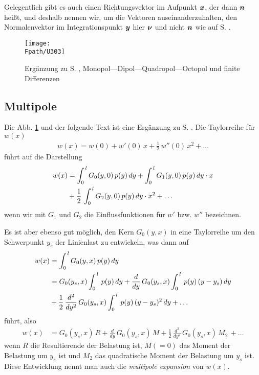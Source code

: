 \begin{remark}
Gelegentlich gibt es auch einen Richtungsvektor im Aufpunkt $\mbox{\boldmath $x$}$, der dann $\mbox{\boldmath $n$}$ hei{\ss}t, und deshalb nennen wir, um die Vektoren auseinanderzuhalten, den Normalenvektor im Integrationspunkt $\mbox{\boldmath $y$}$ hier $\mbox{\boldmath $\nu$}$ und nicht $\mbox{\boldmath $n$}$ wie auf S. \pageref{Ergebnis}.
\end{remark}
\begin{figure}[tbp]
\centering
\if {} \sidecaption[t] \fi
\texttt{[image: \\Fpath/U303]}
\caption{Erg\"{a}nzung zu S. \pageref{Footnote1}, Monopol---Dipol---Quadropol---Octopol und finite Differenzen} \label{U303}
\end{figure}%

\textcolor{sectionTitleBlue}{\subsection{Multipole}}\label{Multipole}
Die Abb. \ref{U303} und der folgende Text ist eine Erg\"{a}nzung zu S. \pageref{Footnote1}. Die Taylorreihe f\"{u}r $w(x)$
\begin{align}
w(x) = w(0) + w'(0)\, x + \frac{1}{2}\,w''(0)\,x^2 + \ldots
\end{align}
f\"{u}hrt auf die Darstellung
\begin{align}
w(x) &= \int_0^{\,l} G_0(y,0)\,p(y)\,dy + \int_0^{\,l} G_1(y,0)\,p(y)\,dy \cdot x \nonumber \\
&+ \frac{1}{2}\, \int_0^{\,l} G_2(y,0)\,p(y)\,dy \cdot x^2 + \ldots
\end{align}
wenn wir mit $G_1$ und $G_2$ die Einflussfunktionen f\"{u}r $w'$ bzw. $w''$ bezeichnen.

Es ist aber ebenso gut m\"{o}glich, den Kern $G_0(y,x)$ in eine Taylorreihe um den Schwerpunkt $y_s$ der Linienlast zu entwickeln, was dann auf
\begin{align}
w(x) &= \int_0^{\,l} G_0(y,x)\,p(y)\,dy \nonumber\\
&= G_0(y_s,x) \int_0^{\,l} \,p(y)\,dy + \frac{d}{dy}\, G_0(y_s,x)\int_0^{\,l} \,p(y)\,(y - y_s)\,dy \nonumber \\
&+ \frac{1}{2}\,\frac{d^2}{dy^2}\, G_0(y_s,x) \int_0^{\,l} \,p(y)\,(y-y_s)^2\,dy + \ldots
\end{align}
f\"{u}hrt, also
\begin{align}\label{Eq136}
w(x) &=  G_0(y_s,x)\,R + \frac{d}{dy}\, G_0(y_s,x)\,M + \frac{1}{2}\, \frac{d^2}{dy^2}\, G_0(y_s,x)\,M_2 \,+ \ldots
\end{align}
wenn $R$ die Resultierende der Belastung ist, $M (= 0)$ das Moment der Belastung um $y_s$ ist und $M_2$ das \glq quadratische\grq{} Moment der Belastung um $y_s$ ist. Diese Entwicklung nennt man auch die {\em multipole expansion\/} von $w(x)$.


